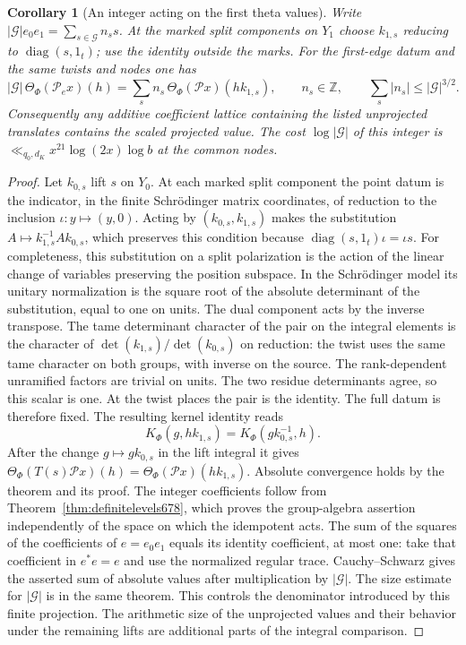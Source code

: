 \documentclass[a4paper,11pt]{article}
\newtheorem{corollary}[proposition]{Corollary}
\theoremstyle{definition}
\theoremstyle{remark}
\numberwithin{equation}{section}
\begin{document}
\begin{corollary}[An integer acting on the first theta values]\leavevmode
\label{cor:firstprojection708}
Write \(|\mathcal G|e_0e_1=\sum_{s\in\mathcal G}n_s s\).
At the marked split components on \(Y_1\) choose
\(k_{1,s}\) reducing to \(\operatorname{diag}(s,1_t)\);
use the identity outside the marks. For the first-edge
datum and the same twists and nodes one has
\[
 |\mathcal G|\,\Theta_\Phi(\mathcal P_e x)(h)
     =\sum_s n_s\,\Theta_\Phi(\mathcal P x)(h k_{1,s}),
 \qquad n_s\in\mathbb Z,\qquad
               \sum_s|n_s|\le|\mathcal G|^{3/2}.
\]
Consequently any additive coefficient lattice containing the
listed unprojected translates contains the scaled projected
value. The cost \(\log|\mathcal G|\) of this integer is
\(\ll_{q_0,d_K} x^{21}\log(2x)\log b\) at the common nodes.
\end{corollary}
\begin{proof}
Let \(k_{0,s}\) lift \(s\) on \(Y_0\). At each marked
split component the point datum is the indicator, in
the finite Schr\"odinger matrix coordinates, of reduction
to the inclusion \(\iota:y\mapsto (y,0)\). Acting by
\((k_{0,s},k_{1,s})\) makes the substitution
\(A\mapsto k_{1,s}^{-1}Ak_{0,s}\), which preserves this
condition because \(\operatorname{diag}(s,1_t)\iota=\iota s\).
For completeness, this substitution on a split polarization
is the action of the linear change of variables preserving
the position subspace. In the Schr\"odinger model its
unitary normalization is the square root of the absolute
determinant of the substitution, equal to one on units.
The dual component acts by the inverse transpose. The tame
determinant character of the pair on the integral elements
is the character of \(\det(k_{1,s})/\det(k_{0,s})\) on
reduction: the twist uses the same tame character on both
groups, with inverse on the source. The rank-dependent
unramified factors are trivial on units. The two residue
determinants agree, so this scalar is one. At the twist
places the pair is the identity. The full datum is therefore
fixed. The resulting kernel identity reads
\[
 K_\Phi(g,h k_{1,s})=K_\Phi(g k_{0,s}^{-1},h).
\]
After the change \(g\mapsto g k_{0,s}\) in the lift integral
it gives \(\Theta_\Phi(T(s)\mathcal P x)(h)
=\Theta_\Phi(\mathcal P x)(h k_{1,s})\).
Absolute convergence holds by the theorem and its proof.
The integer coefficients follow from
Theorem~\ref{thm:definitelevels678}, which proves the
group-algebra assertion independently of the space on
which the idempotent acts. The sum of the squares of the
coefficients of \(e=e_0e_1\) equals its identity coefficient,
at most one: take that coefficient in \(e^*e=e\) and use the
normalized regular trace. Cauchy--Schwarz gives the asserted
sum of absolute values after multiplication by \(|\mathcal G|\).
The size estimate for \(|\mathcal G|\) is in the same theorem.
This controls the denominator introduced by this finite
projection. The arithmetic size of the unprojected values
and their behavior under the remaining lifts are additional
parts of the integral comparison.
\end{proof}
\end{document}
